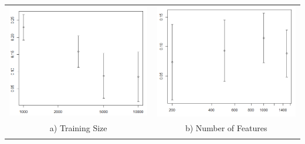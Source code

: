 \documentclass[11pt]{article}
\begin{document}
\begin{table}[H]
	\begin{tabular}{c c}
		\begin{minipage}{.45\textwidth}
			\centering		
			\includegraphics[width=0.99\textwidth]{ts}
		\end{minipage}
		&
		\begin{minipage}{.45\textwidth}
			\centering
			\includegraphics[width=0.99\textwidth]{nf}
		\end{minipage} 
		\\
		a) Training Size & b) Number of Features\\
		\begin{minipage}{.45\textwidth}

\end{minipage}
\end{tabular}
\end{table}
\end{document}
